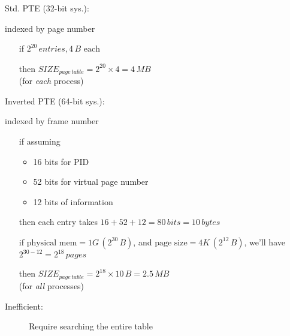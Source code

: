 \begin{frame}%
  \begin{minipage}[t]{.39\linewidth}
    Std. PTE (32-bit sys.):
    \begin{center}

      \scriptsize{indexed by page number}
    \end{center}
    \begin{itemize}
    \item[if] $2^{20}\,entries, 4\,B\text{ each}$
    \item[then] $SIZE_{page\,table}=2^{20}\times{}4 = 4\,MB$ \\(for \emph{each} process)
    \end{itemize}
  \end{minipage}
  \hfill
  \begin{minipage}[t]{.58\linewidth}
    Inverted PTE (64-bit sys.):
    \begin{center}

      \scriptsize{indexed by frame number}
    \end{center}
    \begin{itemize}
    \item[if] assuming
      \begin{itemize}
      \item 16 bits for PID
      \item 52 bits for virtual page number
      \item 12 bits of information
      \end{itemize}
    \item[then] each entry takes $16 + 52 + 12 = 80\,bits = 10\,bytes$
    \item[if] $\text{physical mem}=1G\,(2^{30}\,B)$, and $\text{page
        size}=4K\,(2^{12}\,B)$, we'll have $2^{30-12} = 2^{18}\,pages$
    \item[then] $SIZE_{page\,table}=2^{18}\times{}10\,B=2.5\,MB$ \\(for \emph{all}
      processes)
    \end{itemize}
  \end{minipage}
\end{frame}

\begin{frame}
  \begin{description}
  \item[Inefficient:] Require searching the entire table 
  \end{description}
  \begin{center}
  \end{center}
\end{frame}

